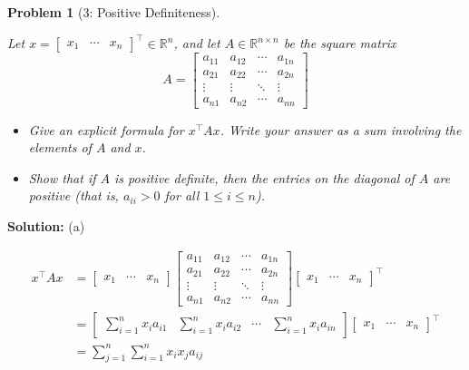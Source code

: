 \documentclass[11pt]{exam}
\theoremstyle{quest}
\newtheorem*{question}{Problem}
\begin{document}
\begin{question}[3: Positive Definiteness]
~

Let $x = \begin{bmatrix}x_1 & \cdots & x_n\end{bmatrix}^\top \in \mathbb{R}^n$,
and let $A \in \mathbb{R}^{n \times n}$ be the square matrix
\begin{equation*}
A = \begin{bmatrix}
  a_{11} & a_{12} & \cdots & a_{1n} \\
  a_{21} & a_{22} & \cdots & a_{2n} \\
  \vdots  & \vdots  & \ddots & \vdots  \\
  a_{n1} & a_{n2} & \cdots & a_{nn}
\end{bmatrix}
\end{equation*}

\begin{itemize}
\item[(a)] Give an explicit formula for $x^\top A x$. Write your answer as a sum
  involving the elements of $A$ and $x$.
\item[(b)] Show that if $A$ is positive definite, then the entries on the
  diagonal of $A$ are positive (that is, $a_{ii} > 0$ for all
  $1 \leq i \leq n$).
\end{itemize}
\end{question}
\textbf{Solution:}
(a) 

\begin{align*}
x^\top Ax &= \begin{bmatrix}x_1 & \cdots & x_n\end{bmatrix} \begin{bmatrix}
  a_{11} & a_{12} & \cdots & a_{1n} \\
  a_{21} & a_{22} & \cdots & a_{2n} \\
  \vdots  & \vdots  & \ddots & \vdots  \\
  a_{n1} & a_{n2} & \cdots & a_{nn}
\end{bmatrix}  \begin{bmatrix}x_1 & \cdots & x_n\end{bmatrix}^\top\\
&= \begin{bmatrix} \sum_{i=1}^n x_ia_{i1} & \sum_{i=1}^n x_ia_{i2} & \cdots &  \sum_{i=1}^n x_ia_{in}
\end{bmatrix} \begin{bmatrix}x_1 & \cdots & x_n\end{bmatrix}^\top\\
&= \sum_{j=1}^n \sum_{i=1}^n x_ix_ja_{ij}
\end{align*}
\end{document}
